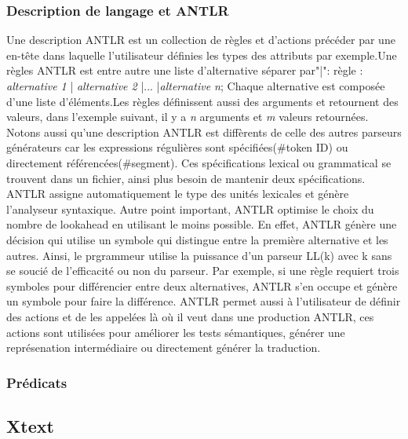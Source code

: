 \documentclass{article}
\begin{document}
{\subsubsection{Description de langage et ANTLR}
Une description ANTLR est un collection de règles et d'actions précéder par une en-tête dans laquelle l'utilisateur définies les types des attributs par exemple.\line Une règles ANTLR est entre autre une liste d'alternative séparer par"|":\newline
règle : \textit{alternative \textsl{1}} | \textit{alternative \textsl{2}} |... |\textit{alternative \textsl{n}};\newline
Chaque alternative est composée d'une liste d'éléments.Les règles définissent aussi des arguments et retournent des valeurs, dans l'exemple suivant, il y a \textsl{n} arguments et \textsl{m} valeurs retournées.\newline
Notons aussi qu'une description ANTLR est diffèrents de celle des autres parseurs générateurs car les expressions régulières sont spécifiées\left(\#token ID\right) ou directement référencées\left(\#segment\right). Ces spécifications lexical ou grammatical se trouvent dans un fichier, ainsi plus besoin de mantenir deux spécifications. ANTLR assigne automatiquement le type des unités lexicales et génère l'analyseur syntaxique.
Autre point important, ANTLR optimise le choix du nombre de lookahead en utilisant le moins possible. En effet, ANTLR génère une décision qui utilise un symbole qui distingue entre la première alternative et les autres. Ainsi, le prgrammeur utilise la puissance d'un parseur LL\left(k\right) avec k sans se soucié de l'efficacité ou non du parseur. Par exemple, si une règle requiert trois symboles pour différencier entre deux alternatives, ANTLR s'en occupe et génère un symbole pour faire la différence.
ANTLR permet aussi à l'utilisateur de définir des actions et de les appelées là où il veut dans une production ANTLR, ces actions sont utilisées pour améliorer les tests sémantiques, générer une représenation intermédiaire ou directement générer la traduction.
\subsubsection{Prédicats}


\subsection{Xtext}
}
\end{document}

